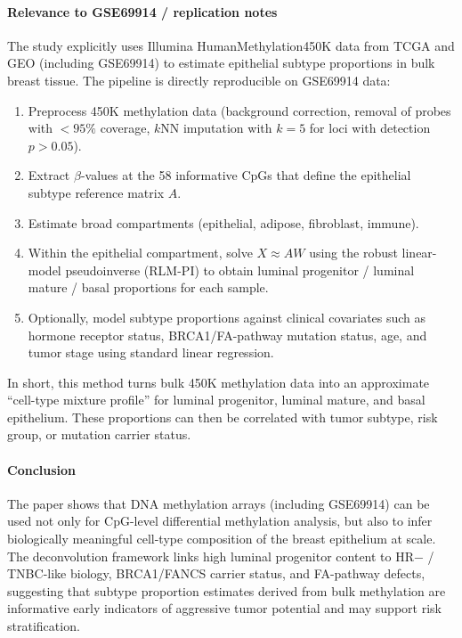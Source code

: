 \documentclass[10pt]{extarticle}
\begin{document}
\paragraph{Relevance to GSE69914 / replication notes}
The study explicitly uses Illumina HumanMethylation450K data from TCGA and GEO (including GSE69914) to estimate epithelial subtype proportions in bulk breast tissue. The pipeline is directly reproducible on GSE69914 data:
\begin{enumerate}
    \item Preprocess 450K methylation data (background correction, removal of probes with $<95\%$ coverage, $k$NN imputation with $k=5$ for loci with detection $p>0.05$).
    \item Extract $\beta$-values at the 58 informative CpGs that define the epithelial subtype reference matrix $A$.
    \item Estimate broad compartments (epithelial, adipose, fibroblast, immune).
    \item Within the epithelial compartment, solve $X \approx A W$ using the robust linear-model pseudoinverse (RLM-PI) to obtain luminal progenitor / luminal mature / basal proportions for each sample.
    \item Optionally, model subtype proportions against clinical covariates such as hormone receptor status, BRCA1/FA-pathway mutation status, age, and tumor stage using standard linear regression.
\end{enumerate}
In short, this method turns bulk 450K methylation data into an approximate ``cell-type mixture profile'' for luminal progenitor, luminal mature, and basal epithelium. These proportions can then be correlated with tumor subtype, risk group, or mutation carrier status.

\paragraph{Conclusion}
The paper shows that DNA methylation arrays (including GSE69914) can be used not only for CpG-level differential methylation analysis, but also to infer biologically meaningful cell-type composition of the breast epithelium at scale. The deconvolution framework links high luminal progenitor content to HR$-$ / TNBC-like biology, BRCA1/FANCS carrier status, and FA-pathway defects, suggesting that subtype proportion estimates derived from bulk methylation are informative early indicators of aggressive tumor potential and may support risk stratification.
\end{document}
